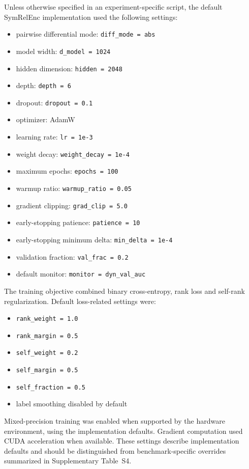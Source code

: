 \documentclass[11pt]{article}
\begin{document}
Unless otherwise specified in an experiment-specific script, the default SymRelEnc implementation used the following settings:
\begin{itemize}
    \item pairwise differential mode: \texttt{diff\_mode = abs}
    \item model width: \texttt{d\_model = 1024}
    \item hidden dimension: \texttt{hidden = 2048}
    \item depth: \texttt{depth = 6}
    \item dropout: \texttt{dropout = 0.1}
    \item optimizer: AdamW
    \item learning rate: \texttt{lr = 1e-3}
    \item weight decay: \texttt{weight\_decay = 1e-4}
    \item maximum epochs: \texttt{epochs = 100}
    \item warmup ratio: \texttt{warmup\_ratio = 0.05}
    \item gradient clipping: \texttt{grad\_clip = 5.0}
    \item early-stopping patience: \texttt{patience = 10}
    \item early-stopping minimum delta: \texttt{min\_delta = 1e-4}
    \item validation fraction: \texttt{val\_frac = 0.2}
    \item default monitor: \texttt{monitor = dyn\_val\_auc}
\end{itemize}

The training objective combined binary cross-entropy, rank loss and self-rank regularization. Default loss-related settings were:
\begin{itemize}
    \item \texttt{rank\_weight = 1.0}
    \item \texttt{rank\_margin = 0.5}
    \item \texttt{self\_weight = 0.2}
    \item \texttt{self\_margin = 0.5}
    \item \texttt{self\_fraction = 0.5}
    \item label smoothing disabled by default
\end{itemize}

Mixed-precision training was enabled when supported by the hardware environment, using the implementation defaults. Gradient computation used CUDA acceleration when available. These settings describe implementation defaults and should be distinguished from benchmark-specific overrides summarized in Supplementary Table~S4.
\end{document}
